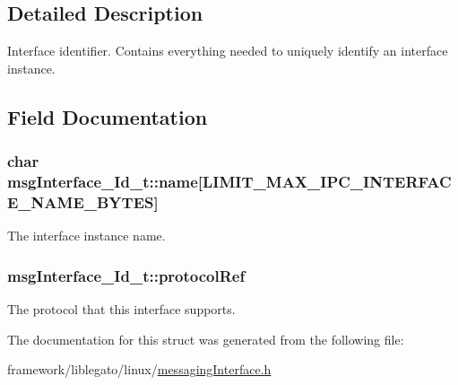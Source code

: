 \subsection{Detailed Description}
Interface identifier. Contains everything needed to uniquely identify an interface instance. 

\subsection{Field Documentation}
\subsubsection[{\texorpdfstring{name}{name}}]{\setlength{\rightskip}{0pt plus 5cm}char msg\+Interface\+\_\+\+Id\+\_\+t\+::name\mbox{[}{\bf L\+I\+M\+I\+T\+\_\+\+M\+A\+X\+\_\+\+I\+P\+C\+\_\+\+I\+N\+T\+E\+R\+F\+A\+C\+E\+\_\+\+N\+A\+M\+E\+\_\+\+B\+Y\+T\+ES}\mbox{]}}\hypertarget{structmsg_interface___id__t_a25a5cbcc6de98932eea62f2044395d4f}{}\label{structmsg_interface___id__t_a25a5cbcc6de98932eea62f2044395d4f}


The interface instance name. 

\subsubsection[{\texorpdfstring{protocol\+Ref}{protocolRef}}]{ msg\+Interface\+\_\+\+Id\+\_\+t\+::protocol\+Ref}\hypertarget{structmsg_interface___id__t_a7afc3e4059efbf1bbe9353230f98aff2}{}\label{structmsg_interface___id__t_a7afc3e4059efbf1bbe9353230f98aff2}


The protocol that this interface supports. 



The documentation for this struct was generated from the following file\+:\begin{DoxyCompactItemize}
\item 
framework/liblegato/linux/\hyperlink{messaging_interface_8h}{messaging\+Interface.\+h}\end{DoxyCompactItemize}
